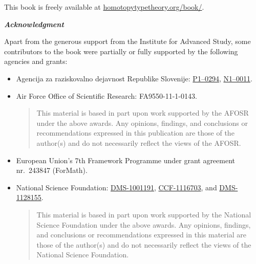{\bigskip

\noindent
This book is freely available at \href{http://homotopytypetheory.org/book/}{homotopytypetheory.org/book/}.

\bigskip

\noindent
\emph{\textbf{\small Acknowledgment}}

\medskip

\noindent
Apart from the generous support from the Institute for Advanced Study, some contributors
to the book were partially or fully supported by the following agencies and grants:
%
\begin{itemize}
\item Agencija za raziskovalno dejavnost Republike Slovenije:  %
\href{http://www.sicris.si/search/prg.aspx?id=6120}{P1--0294},
\href{http://www.sicris.si/search/prj.aspx?id=7109}{N1--0011}.

\item Air Force Office of Scientific Research:
  FA9550-11-1-0143. %
  {
    \setlength{\parskip}{0pt}
    \begin{quote}
      \noindent\scriptsize
      This material is based in part upon work supported by the AFOSR under the above awards.
      Any opinions, findings, and conclusions or recommendations expressed in this publication are those of the author(s) and do not necessarily reflect the views of the AFOSR.
    \end{quote}
  }
\item European Union's 7th Framework Programme under grant agreement nr.\ 243847 (ForMath). %

\item National Science Foundation: 
  \href{http://www.nsf.gov/awardsearch/showAward.do?AwardNumber=1001191}{DMS-1001191}, %
  \href{http://www.nsf.gov/awardsearch/showAward.do?AwardNumber=1116703}{CCF-1116703}, %
  and 
  \href{http://www.nsf.gov/awardsearch/showAward.do?AwardNumber=1128155}{DMS-1128155}. %
  {
    \setlength{\itemsep}{0pt}
    \begin{quote}
      \noindent\scriptsize
      This material is based in part upon work supported by the
      National Science Foundation under the above awards.  Any opinions,
      findings, and conclusions or recommendations expressed in this
      material are those of the author(s) and do not necessarily reflect the
      views of the National Science Foundation.
    \end{quote}
  }
  \end{itemize}

}
\cleartooddpage


